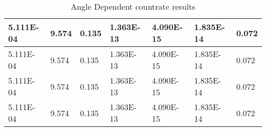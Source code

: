 \begin{table}[!ht]
{\begin{tabular}{|l|l|l|l|l|l|l|}
        5.111E-04 & 9.574 & 0.135 & 1.363E-13 & 4.090E-15 & 1.835E-14 & 0.072 \\ \hline
        5.111E-04 & 9.574 & 0.135 & 1.363E-13 & 4.090E-15 & 1.835E-14 & 0.072 \\ \hline
        5.111E-04 & 9.574 & 0.135 & 1.363E-13 & 4.090E-15 & 1.835E-14 & 0.072 \\ \hline
        5.111E-04 & 9.574 & 0.135 & 1.363E-13 & 4.090E-15 & 1.835E-14 & 0.072 \\ \hline
    \end{tabular}%
    }
    \caption{Angle Dependent countrate results \label{tab:angle_dependend_countrate_results}}
\end{table}